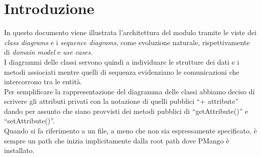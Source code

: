 \documentclass[a4paper, 12pt]{report}
\begin{document}
\tableofcontents

\newpage

\section{Introduzione}
In questo documento viene illustrata l'architettura del modulo tramite le viste dei \emph{class diagrams} e i \emph{sequence diagrams}, come evoluzione naturale, rispettivamente di \emph{domain model} e \emph{use cases}. \\
I diagrammi delle classi servono quindi a individuare le strutture dei dati e i metodi assiociati mentre quelli di sequenza evidenziano le comunicazioni che intercorrono tra le entit\`a. \\
Per semplificare la rappresentazione del diagramma delle classi abbiamo deciso di scrivere gli attributi privati con la notazione di quelli pubblici ``+ attribute'' dando per assunto che siano provvisti dei metodi pubblici di ``getAttribute()'' e ``setAttribute()''. \\
Quando si fa riferimento a un file, a meno che non sia espressamente specificato, \`e sempre un path che inizia implicitamente dalla root path dove PMango \`e installato.
\end{document}
